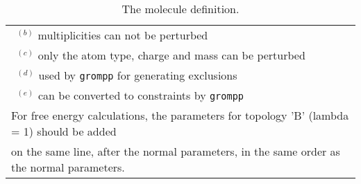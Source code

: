 \begin{table}[p]
{\begin{tabular}{|l|lllll|}
\multicolumn{6}{l}{~$^{(b)}$ multiplicities can not be perturbed}\\
\multicolumn{6}{l}{~$^{(c)}$ only the atom type, charge and mass can be perturbed} \\
\multicolumn{6}{l}{~$^{(d)}$ used by {\tt grompp} for generating exclusions}\\
\multicolumn{6}{l}{~$^{(e)}$ can be converted to constraints by {\tt grompp}}\\
\multicolumn{6}{l}{For free energy calculations, the parameters for topology 'B' (lambda = 1) should be added}\\
\multicolumn{6}{l}{on the same line, after the normal parameters,
in the same order as the normal parameters.}
\end{tabular}
}
\caption{The molecule definition.}
\label{tab:topfile2}
\end{table}



